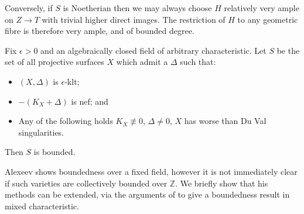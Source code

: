 \documentclass[a4paper,12pt]{book}
\begin{document}
Conversely, if $S$ is Noetherian then we may always choose $H$ relatively very ample on $Z \to T$ with trivial higher direct images. The restriction of $H$ to any geometric fibre is therefore very ample, and of bounded degree. 

\begin{theorem}\cite[Theorem 6.9]{alexeev1994boundedness}\label{BAB}
	Fix $\epsilon >0$ and an algebraically closed field of arbitrary characteristic. Let $S$ be the set of all projective surfaces $X$ which admit a $\Delta$ such that:
	\begin{itemize}
		\item $(X,\Delta)$ is $\epsilon$-klt;
		\item $-(K_{X}+\Delta)$ is nef; and
		\item Any of the following holds $K_{X} \not\equiv 0$, $\Delta \neq 0$, $X$ has worse than Du Val singularities.
	\end{itemize}
	Then $S$ is bounded.
\end{theorem}

Alexeev shows boundedness over a fixed field, however it is not immediately clear if such varieties are collectively bounded over $\mathbb{Z}$. We briefly show that his methods can be extended, via the arguments of \cite{witaszek2015effective} to give a boundedness result in mixed characteristic.
\end{document}
